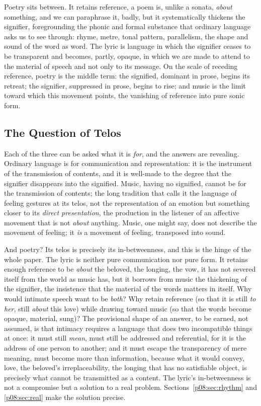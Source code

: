 Poetry sits between. It retains reference, a poem is, unlike a sonata, \emph{about} something, and we can paraphrase it, badly, but it systematically thickens the signifier, foregrounding the phonic and formal substance that ordinary language asks us to see through: rhyme, metre, tonal pattern, parallelism, the shape and sound of the word as word. The lyric is language in which the signifier ceases to be transparent and becomes, partly, opaque, in which we are made to attend to the material of speech and not only to its message. On the scale of receding reference, poetry is the middle term: the signified, dominant in prose, begins its retreat; the signifier, suppressed in prose, begins to rise; and music is the limit toward which this movement points, the vanishing of reference into pure sonic form.

\subsection{The Question of Telos}

Each of the three can be asked what it is \emph{for}, and the answers are revealing. Ordinary language is for communication and representation: it is the instrument of the transmission of contents, and it is well-made to the degree that the signifier disappears into the signified. Music, having no signified, cannot be for the transmission of contents; the long tradition that calls it the language of feeling gestures at its telos, not the representation of an emotion but something closer to its \emph{direct presentation}, the production in the listener of an affective movement that is not \emph{about} anything. Music, one might say, does not describe the movement of feeling; it \emph{is} a movement of feeling, transposed into sound.

And poetry? Its telos is precisely its in-betweenness, and this is the hinge of the whole paper. The lyric is neither pure communication nor pure form. It retains enough reference to be \emph{about} the beloved, the longing, the vow, it has not severed itself from the world as music has, but it borrows from music the thickening of the signifier, the insistence that the material of the words matters in itself. Why would intimate speech want to be \emph{both}? Why retain reference (so that it is still \emph{to her}, still \emph{about} this love) while drawing toward music (so that the words become opaque, material, sung)? The provisional shape of an answer, to be earned, not assumed, is that intimacy requires a language that does two incompatible things at once: it must still \emph{mean}, must still be addressed and referential, for it is the address of one person to another; and it must escape the transparency of mere meaning, must become more than information, because what it would convey, love, the beloved's irreplaceability, the longing that has no satisfiable object, is precisely what cannot be transmitted as a content. The lyric's in-betweenness is not a compromise but a solution to a real problem. Sections~\ref{p08:sec:rhythm} and \ref{p08:sec:real} make the solution precise.

